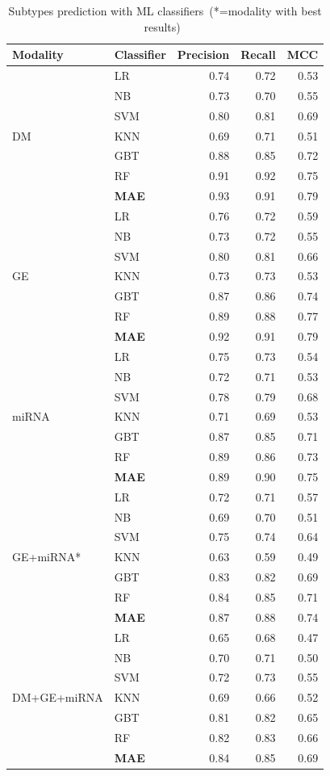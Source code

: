 \begin{table}
	\renewcommand{\arraystretch}{0.9}
	\caption{Subtypes prediction with ML classifiers~(*=modality with best results)~\cite{karimACCESS2019}}
	\label{table:classification}
	\vspace{-2mm}
	\scriptsize
	\centering
	\begin{tabular}{p{2.5cm}|l|r|r|r}
		\toprule
		\textbf{Modality} & \textbf{Classifier} & \textbf{Precision} & \textbf{Recall} & \textbf{MCC}\\ \hline
		\multirow{7}{*}{DM} & LR & 0.74 & 0.72 & 0.53 \\
		& NB & 0.73 & 0.70 & 0.55 \\
		& SVM & 0.80 & 0.81 & 0.69 \\
		& KNN & 0.69 & 0.71 & 0.51 \\
		& GBT & 0.88 & 0.85 & 0.72\\
		& RF & 0.91 & 0.92 & 0.75\\
		& \textbf{MAE}  & 0.93 & 0.91 & 0.79 \\
		\hline
		\multirow{7}{*}{GE} & LR & 0.76 & 0.72 & 0.59 \\
		& NB & 0.73 & 0.72 & 0.55 \\
		& SVM & 0.80 & 0.81 & 0.66 \\
		& KNN & 0.73 & 0.73 & 0.53 \\
		& GBT & 0.87 & 0.86 & 0.74\\
		& RF & 0.89 & 0.88 & 0.77\\
		& \textbf{MAE} & 0.92 & 0.91 & 0.79 \\ 
		\hline
		\multirow{7}{*}{miRNA} & LR & 0.75 & 0.73 & 0.54 \\
		& NB & 0.72 & 0.71 & 0.53 \\
		& SVM & 0.78 & 0.79 & 0.68 \\
		& KNN & 0.71 & 0.69 & 0.53 \\
		& GBT & 0.87 & 0.85 & 0.71\\
		& RF & 0.89 & 0.86 & 0.73\\
		& \textbf{MAE} & 0.89 & 0.90 & 0.75 \\ 
		\hline
		\multirow{7}{*}{GE+miRNA*} & LR & 0.72 & 0.71 & 0.57 \\
		& NB & 0.69 & 0.70 & 0.51 \\
		& SVM & 0.75 & 0.74 & 0.64 \\
		& KNN & 0.63 & 0.59 & 0.49 \\
		& GBT & 0.83 & 0.82 & 0.69\\
		& RF & 0.84 & 0.85 & 0.71\\
		& \textbf{MAE} & 0.87 & 0.88 & 0.74 \\ 
		\hline
		\multirow{7}{*}{DM+GE+miRNA} & LR & 0.65 & 0.68 & 0.47 \\
		& NB & 0.70 & 0.71 & 0.50 \\
		& SVM & 0.72 & 0.73 & 0.55 \\
		& KNN & 0.69 & 0.66 & 0.52 \\
		& GBT & 0.81 & 0.82 & 0.65\\
		& RF & 0.82 & 0.83 & 0.66\\
		& \textbf{MAE} & 0.84 & 0.85 & 0.69 \\
        \hline
	\end{tabular}
\end{table}

